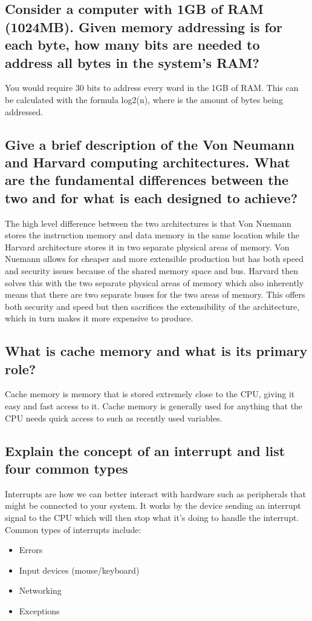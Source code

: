 \documentclass[11pt]{scrartcl}
\begin{document}
\subsection*{Consider a computer with 1GB of RAM (1024MB). Given memory addressing
             is for each byte, how many bits are needed to address all bytes in the
             system's RAM?}
You would require 30 bits to address every word in the 1GB of RAM. This can be
calculated with the formula log2(n), where is the amount of bytes being addressed.

\subsection*{Give a brief description of the Von Neumann and Harvard computing
             architectures. What are the fundamental differences between the two
             and for what is each designed to achieve?}
The high level difference between the two architectures is that Von Nuemann stores the
instruction memory and data memory in the same location while the Harvard architecture
stores it in two separate physical areas of memory. Von Nuemann allows for cheaper and
more extensible production but has both speed and security issues because of the shared
memory space and bus. Harvard then solves this with the two separate physical areas of
memory which also inherently means that there are two separate buses for the two areas
of memory. This offers both security and speed but then sacrifices the extensibility of
the architecture, which in turn makes it more expensive to produce.

\subsection*{What is cache memory and what is its primary role?}
Cache memory is memory that is stored extremely close to the CPU, giving it easy and
fast access to it. Cache memory is generally used for anything that the CPU needs quick
access to such as recently used variables.

\subsection*{Explain the concept of an interrupt and list four common types}
Interrupts are how we can better interact with hardware such as peripherals that might
be connected to your system. It works by the device sending an interrupt signal to the
CPU which will then stop what it's doing to handle the interrupt. Common types of
interrupts include:
\begin{itemize}
    \item Errors
    \item Input devices (mouse/keyboard)
    \item Networking
    \item Exceptions
\end{itemize}
\end{document}
